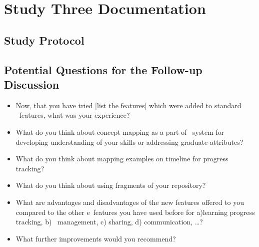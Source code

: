 \chapter{Study Three Documentation \label{cha:app7}}

\section{Study Protocol}

\section{Potential Questions for the Follow-up Discussion}
\begin{itemize}
  \item Now, that you have tried [list the features] which were added to
  standard \ep~features, what was your experience?
  \item What do you think about concept mapping as a part of \ep~system
  for developing understanding of your skills or addressing graduate attributes?
  \item What do you think about mapping examples on timeline for progress
  tracking?
  \item What do you think about using fragments of your repository?
  \item What are advantages and disadvantages of the new features offered to you
  compared to the other e\ep~features you have used before for a)learning
  progress tracking, b) \ep~management, c) sharing, d) communication, \ldots?
  \item What further improvements would you recommend?
\end{itemize}

